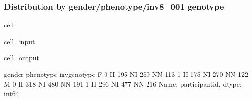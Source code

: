 \documentclass[letterpaper,10pt,english]{jupyterBook}
\begin{document}
\subsubsection{Distribution by gender/phenotype/inv8\_001 genotype}
\label{\detokenize{Cooper:distribution-by-gender-phenotype-inv8-001-genotype}}
\begin{sphinxuseclass}{cell}\begin{sphinxVerbatimInput}

\begin{sphinxuseclass}{cell_input}
\begin{sphinxVerbatim}[commandchars=\\\{\}]
\PYG{p}{[}  \PYG{p}{]}\PYG{p}{[}\PYG{p}{]}
\end{sphinxVerbatim}

\end{sphinxuseclass}\end{sphinxVerbatimInput}
\begin{sphinxVerbatimOutput}

\begin{sphinxuseclass}{cell_output}
\begin{sphinxVerbatim}[commandchars=\\\{\}]
gender  phenotype  inv\PYGZus{}genotype
F       0          II              195
                   NI              259
                   NN              113
        1          II              175
                   NI              270
                   NN              122
M       0          II              318
                   NI              480
                   NN              191
        1          II              296
                   NI              477
                   NN              216
Name: participant\PYGZus{}id, dtype: int64
\end{sphinxVerbatim}

\end{sphinxuseclass}\end{sphinxVerbatimOutput}

\end{sphinxuseclass}
\end{document}
